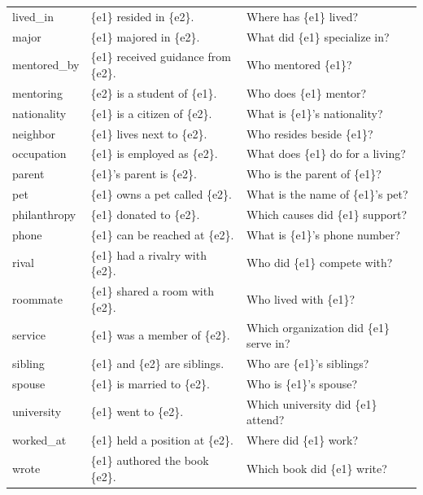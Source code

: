 \documentclass[11pt]{article}
\begin{document}
\begin{table}[htbp]
{\begin{tabular}{l p{5cm} p{5.5cm}}
lived\_in & \{e1\} resided in \{e2\}. & Where has \{e1\} lived? \\
major & \{e1\} majored in \{e2\}. & What did \{e1\} specialize in? \\
mentored\_by & \{e1\} received guidance from \{e2\}. & Who mentored \{e1\}? \\
mentoring & \{e2\} is a student of \{e1\}. & Who does \{e1\} mentor? \\
nationality & \{e1\} is a citizen of \{e2\}. & What is \{e1\}'s nationality? \\
neighbor & \{e1\} lives next to \{e2\}. & Who resides beside \{e1\}? \\
occupation & \{e1\} is employed as \{e2\}. & What does \{e1\} do for a living? \\
parent & \{e1\}'s parent is \{e2\}. & Who is the parent of \{e1\}? \\
pet & \{e1\} owns a pet called \{e2\}. & What is the name of \{e1\}'s pet? \\
philanthropy & \{e1\} donated to \{e2\}. & Which causes did \{e1\} support? \\
phone & \{e1\} can be reached at \{e2\}. & What is \{e1\}'s phone number? \\
rival & \{e1\} had a rivalry with \{e2\}. & Who did \{e1\} compete with? \\
roommate & \{e1\} shared a room with \{e2\}. & Who lived with \{e1\}? \\
service & \{e1\} was a member of \{e2\}. & Which organization did \{e1\} serve in? \\
sibling & \{e1\} and \{e2\} are siblings. & Who are \{e1\}'s siblings? \\
spouse & \{e1\} is married to \{e2\}. & Who is \{e1\}'s spouse? \\
university & \{e1\} went to \{e2\}. & Which university did \{e1\} attend? \\
worked\_at & \{e1\} held a position at \{e2\}. & Where did \{e1\} work? \\
wrote & \{e1\} authored the book \{e2\}. & Which book did \{e1\} write? \\
\bottomrule
\end{tabular}
}
\end{table}
\end{document}
